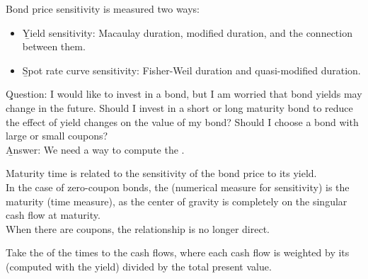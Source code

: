 

Bond price sensitivity is measured two ways:
\begin{itemize}
    \item \b{Yield sensitivity}: Macaulay duration, modified duration, and the connection between them.
    \item \b{Spot rate curve sensitivity}: Fisher-Weil duration and quasi-modified duration.
\end{itemize}

\b{Question}: I would like to invest in a bond, but I am worried that bond yields may change in the future. Should I invest in a short or long maturity bond to reduce the effect of yield changes on the value of my bond? Should I choose a bond with large or small coupons?
\\\b{Answer}: We need a way to compute the .

\begin{center}
\end{center}

Maturity time is related to the sensitivity of the bond price to its yield.
\\In the case of zero-coupon bonds, the  (numerical measure for sensitivity) is the maturity (time measure), as the center of gravity is completely on the singular cash flow at maturity.
\\When there are coupons, the relationship is no longer direct.

Take the  of the times to the cash flows, where each cash flow is weighted by its  (computed with the yield) divided by the total present value.

